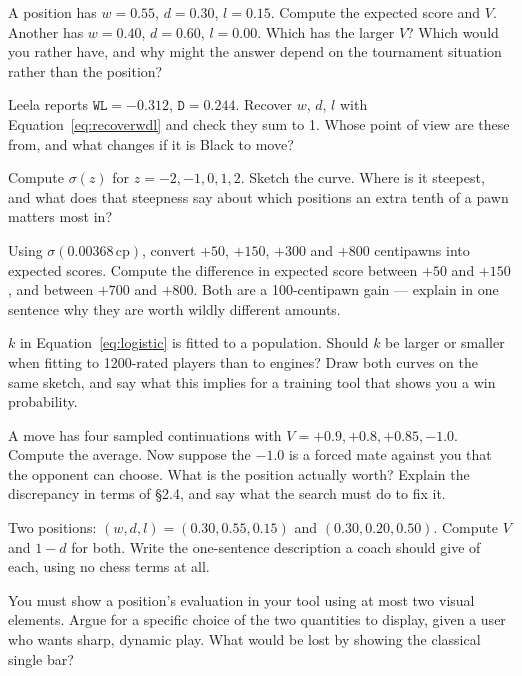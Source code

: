 \begin{exercises}

 A position has $w = 0.55$, $d = 0.30$, $l = 0.15$. Compute
the expected score and $V$. Another has $w = 0.40$, $d = 0.60$, $l = 0.00$. Which has the
larger $V$? Which would you rather have, and why might the answer depend on the tournament
situation rather than the position?

 Leela reports $\texttt{WL} = -0.312$, $\texttt{D} =
0.244$. Recover $w$, $d$, $l$ with Equation~\eqref{eq:recoverwdl} and check they sum to 1.
Whose point of view are these from, and what changes if it is Black to move?

 Compute $\sigma(z)$ for $z = -2, -1, 0, 1, 2$.
Sketch the curve. Where is it steepest, and what does that steepness say about which
positions an extra tenth of a pawn matters most in?

 Using $\sigma(0.00368\,\text{cp})$, convert
$+50$, $+150$, $+300$ and $+800$ centipawns into expected scores. Compute the difference in
expected score between $+50$ and $+150$, and between $+700$ and $+800$. Both are a
100-centipawn gain --- explain in one sentence why they are worth wildly different amounts.

 $k$ in Equation~\eqref{eq:logistic} is fitted to a
population. Should $k$ be larger or smaller when fitting to 1200-rated players than to
engines? Draw both curves on the same sketch, and say what this implies for a training tool
that shows you a win probability.

 A move has four sampled continuations with
$V = +0.9, +0.8, +0.85, -1.0$. Compute the average. Now suppose the $-1.0$ is a forced mate
against you that the opponent can choose. What is the position actually worth? Explain the
discrepancy in terms of §2.4, and say what the search must do to fix it.

 Two positions: $(w,d,l) = (0.30,0.55,0.15)$ and
$(0.30,0.20,0.50)$. Compute $V$ and $1-d$ for both. Write the one-sentence description a
coach should give of each, using no chess terms at all.

 You must show a position's evaluation in your
tool using at most two visual elements. Argue for a specific choice of the two quantities to
display, given a user who wants sharp, dynamic play. What would be lost by showing the
classical single bar?


\end{exercises}

